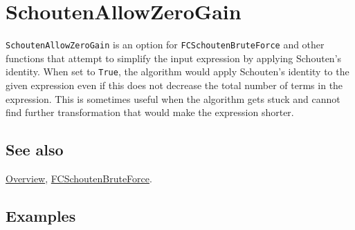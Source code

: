 \documentclass[../FeynCalcManual.tex]{subfiles}
\begin{document}
\hypertarget{schoutenallowzerogain}{%
\section{SchoutenAllowZeroGain}\label{schoutenallowzerogain}}

\texttt{SchoutenAllowZeroGain} is an option for
\texttt{FCSchoutenBruteForce} and other functions that attempt to
simplify the input expression by applying Schouten's identity. When set
to \texttt{True}, the algorithm would apply Schouten's identity to the
given expression even if this does not decrease the total number of
terms in the expression. This is sometimes useful when the algorithm
gets stuck and cannot find further transformation that would make the
expression shorter.

\subsection{See also}

\hyperlink{toc}{Overview},
\hyperlink{fcschoutenbruteforce}{FCSchoutenBruteForce}.

\subsection{Examples}
\end{document}
